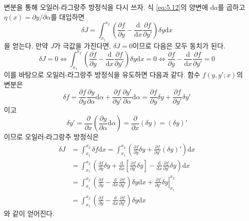 \documentclass[chapter, oneside, b5paper]{oblivoir}
\theoremstyle{plain}
\theoremstyle{definition}
\theoremstyle{remark}
\begin{document}
변분을 통해 오일러-라그랑주 방정식을 다시 쓰자. 식 \ref{eq:5.12}의 양변에 $\mathrm{d}a$를 곱하고 $\eta(x) = \partial{y} / \partial{\alpha}$를 대입하면
\begin{equation}
    \delta J = \int_{x_1}^{x_2} \left(\frac{\partial f}{\partial y} - \frac{\mathrm{d}}{\mathrm{d}x}\frac{\partial f}{\partial y'}\right) \delta y \mathrm{d}x
\end{equation}
을 얻는다. 만약 $J$가 극값을 가진다면, $\delta J = 0$이므로 다음은 모두 동치가 된다.
\begin{equation}
    \delta J = 0 \iff \int_{x_1}^{x_2} \left(\frac{\partial f}{\partial y} - \frac{\mathrm{d}}{\mathrm{d}x}\frac{\partial f}{\partial y'}\right) \delta y \mathrm{d}x = 0 \iff \frac{\partial f}{\partial y} - \frac{\mathrm{d}}{\mathrm{d}x}\frac{\partial f}{\partial y'} = 0
\end{equation}
이를 바탕으로 오일러-라그랑주 방정식을 유도하면 다음과 같다. 함수 $f(y, y';x)$의 변분은
\begin{equation}
    \delta f = \frac{\partial f}{\partial y} \frac{\partial y}{\partial \alpha} \mathrm{d}\alpha + \frac{\partial f}{\partial y'} \frac{\partial y'}{\partial \alpha} \mathrm{d}\alpha = \frac{\partial f}{\partial y} \delta y + \frac{\partial f}{\partial y'} \delta y' \label{eq:5.78}
\end{equation}
이고
\begin{equation}
    \delta y' = \frac{\partial}{\partial x} \left(\frac{\partial y}{\partial \alpha} \mathrm{d}\alpha \right) = \frac{\partial}{\partial x} (\delta y) = (\delta y)'
\end{equation}
이므로 오일러-라그랑주 방정식은
\begin{equation}
    \begin{aligned}
    \delta J &= \int_{x_1}^{x_2} \delta f \mathrm{d}x =\int_{x_1}^{x_2} \left(\frac{\partial f}{\partial y} \delta y + \frac{\partial f}{\partial y'} (\delta y)' \right) \mathrm{d}x \\
    &= \int_{x_1}^{x_2} \left(\frac{\partial f}{\partial y} \delta y + \frac{\mathrm{d}}{\mathrm{d}x}\left[\frac{\partial f}{\partial y'} \delta y\right] - \frac{\mathrm{d}}{\mathrm{d}x}\frac{\partial f}{\partial y'} \delta y \right) \mathrm{d}x \\
    &= \int_{x_1}^{x_2} \left(\frac{\partial f}{\partial y} - \frac{\mathrm{d}}{\mathrm{d}x}\frac{\partial f}{\partial y'}\right) \delta y \mathrm{d}x + {\left. \frac{\partial f}{\partial y'} \delta y \right|}_{x_1}^{x_2} \\
    &= \int_{x_1}^{x_2} \left(\frac{\partial f}{\partial y} - \frac{\mathrm{d}}{\mathrm{d}x}\frac{\partial f}{\partial y'}\right) \delta y \mathrm{d}x
    \end{aligned}
\end{equation}
와 같이 얻어진다.
\end{document}
